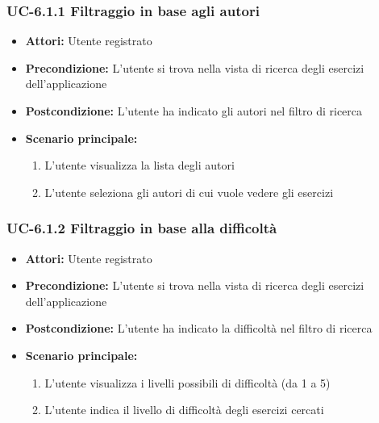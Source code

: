 \subsubsection{UC-6.1.1 Filtraggio in base agli autori}
	\begin{itemize}
		\item \textbf{Attori:} Utente registrato
		\item \textbf{Precondizione: } L'utente si trova nella vista di ricerca degli esercizi dell'applicazione
		\item \textbf{Postcondizione: } L'utente ha indicato gli autori nel filtro di ricerca 
		\item \textbf{Scenario principale:}
		\begin{enumerate}
			\item L'utente visualizza la lista degli autori
			\item L'utente seleziona gli autori di cui vuole vedere gli esercizi			
		\end{enumerate}
	\end{itemize}

\subsubsection{UC-6.1.2 Filtraggio in base alla difficoltà}
	\begin{itemize}
		\item \textbf{Attori:} Utente registrato
		\item \textbf{Precondizione: } L'utente si trova nella vista di ricerca degli esercizi dell'applicazione
		\item \textbf{Postcondizione: } L'utente ha indicato la difficoltà nel filtro di ricerca 
		\item \textbf{Scenario principale:}
		\begin{enumerate}
			\item L'utente visualizza i livelli possibili di difficoltà (da 1 a 5)
			\item L'utente indica il livello di difficoltà degli esercizi cercati
		\end{enumerate}
	\end{itemize}

